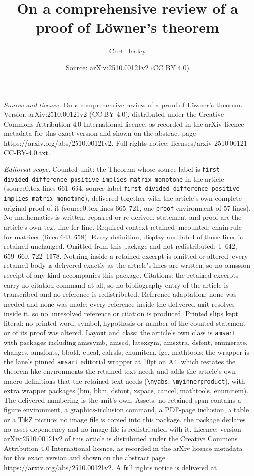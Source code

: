 \documentclass[10pt,a4paper]{amsart}
\title[On a comprehensive review of a proof of L\"owner's theorem]{On a comprehensive review of a proof of L\"owner's theorem}
\author{Curt Healey}
\date{Source: arXiv:2510.00121v2 (CC BY 4.0)}
\begin{document}
\maketitle

\noindent\emph{Source and licence.} On a comprehensive review of a proof of L\"owner's theorem. Version arXiv:2510.00121v2 (CC BY 4.0), distributed under the Creative Commons Attribution 4.0 International licence, as recorded in the arXiv licence metadata for this exact version and shown on the abstract page https://arxiv.org/abs/2510.00121v2. Full rights notice: licenses/arxiv-2510.00121-CC-BY-4.0.txt.\par\smallskip

\noindent\textit{Editorial scope.} Counted unit: the Theorem whose source label is \texttt{first-divided-difference-positive-implies-matrix-monotone} in the article (source0.tex lines 661--664, source label \texttt{first-divided-difference-positive-implies-matrix-monotone}), delivered together with the article's own complete original proof of it (source0.tex lines 665--721, one \texttt{proof} environment of 57 lines). No mathematics is written, repaired or re-derived: statement and proof are the article's own text line for line. Required context retained uncounted: chain-rule-for-matrices (lines 643--658). Every definition, display and label of those lines is retained unchanged. Omitted from this package and not redistributed: 1--642, 659--660, 722--1078. Nothing inside a retained excerpt is omitted or altered: every retained body is delivered exactly as the article's lines are written, so no omission receipt of any kind accompanies this package. Citations: the retained excerpts carry no citation command at all, so no bibliography entry of the article is transcribed and no reference is redistributed. Reference adaptation: none was needed and none was made; every reference inside the delivered unit resolves inside it, so no unresolved reference or citation is produced. Printed slips kept literal: no printed word, symbol, hypothesis or number of the counted statement or of its proof was altered. Layout and class: the article's own class is \texttt{amsart} with packages including amssymb, amscd, latexsym, amsxtra, dsfont, enumerate, changes, amsfonts, bbold, eucal, calrsfs, enumitem, fge, mathtools; the wrapper is the lane's pinned \texttt{amsart} editorial wrapper at 10pt on A4, which restates the theorem-like environments the retained text needs and adds the article's own macro definitions that the retained text needs (\texttt{\textbackslash myabs}, \texttt{\textbackslash myinnerproduct}), with extra wrapper packages (bm, bbm, dsfont, xspace, cancel, mathtools, enumitem). The delivered numbering is the unit's own. Assets: no retained span contains a figure environment, a graphics-inclusion command, a PDF-page inclusion, a table or a TikZ picture; no image file is copied into this package, the package declares no asset dependency and no image file is redistributed with it. Licence: version arXiv:2510.00121v2 of this article is distributed under the Creative Commons Attribution 4.0 International licence, as recorded in the arXiv licence metadata for this exact version and shown on the abstract page https://arxiv.org/abs/2510.00121v2. A full rights notice is delivered at 
\end{document}
